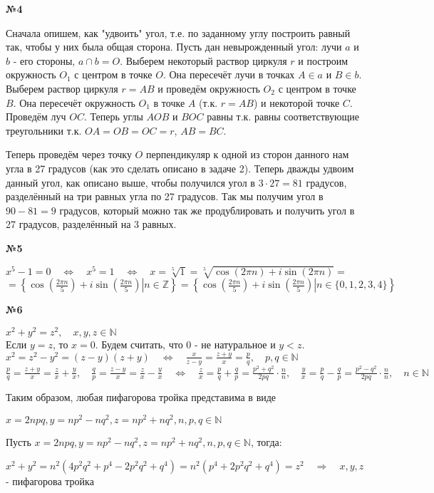 \documentclass{article}
\newenvironment{task}{\begin{center}\fontsize{14}{14}\selectfont\bf}{\rm\fontsize{12}{12}\selectfont\end{center}}
\newcommand{\impl}{\quad\Leftrightarrow\quad}
\newcommand{\rimpl}{\quad\Rightarrow\quad}
\newcommand{\Z}{\mathbb{Z}}
\newcommand{\N}{\mathbb{N}}
\begin{document}
	\begin{task} 
		№4
	\end{task}

	Сначала опишем, как "удвоить" угол, т.е. по заданному углу построить равный так, чтобы у них была общая сторона. 
	Пусть дан невырожденный угол: лучи $a$ и $b$ - его стороны, $a\cap b = O$. 
	Выберем некоторый раствор циркуля $r$ и построим окружность $O_1$ с центром в точке $O$. Она пересечёт лучи в точках $A\in a$ и $B\in b$. Выберем раствор циркуля $r=AB$ и проведём окружность $O_2$ с центром в точке $B$. Она пересечёт окружность $O_1$ в точке $A$ (т.к. $r=AB$) и некоторой точке $C$. Проведём луч $OC$. Теперь углы $AOB$ и $BOC$ равны т.к. равны соответствующие треугольники т.к. $OA=OB=OC=r$, $AB=BC$.
	
	Теперь проведём через точку $O$ перпендикуляр к одной из сторон данного нам угла в 27 градусов (как это сделать описано в задаче 2). Теперь дважды удвоим данный угол, как описано выше, чтобы получился угол в $3\cdot27=81$ градусов, разделённый на три равных угла по 27 градусов. Так мы получим угол в $90 - 81 = 9$ градусов, который можно так же продублировать и получить угол в 27 градусов, разделённый на 3 равных.   
	

	\begin{task} 
		№5
	\end{task}
	\begin{center}
		$x^5 - 1 = 0 \impl x^5 = 1 \impl x = \sqrt[5]{1} = \sqrt[5]{\cos(2\pi n) + i\sin(2 \pi n)} = $\\$
		= \left\lbrace  \cos\left(\frac{2\pi n}{5}\right) + i\sin\left(\frac{2 \pi n}{5}\right) \left|\right. n\in\Z \right\rbrace
		= \left\lbrace  \cos\left(\frac{2\pi n}{5}\right) + i\sin\left(\frac{2 \pi n}{5}\right) \left|\right. n\in \lbrace0, 1, 2, 3, 4\rbrace \right\rbrace$
	\end{center}


	\begin{task} 
		№6
	\end{task}
	\begin{center}
		$x^2 + y^2 = z^2, \quad x, y, z \in\N$ \\
		Если $y=z$, то $x=0$. Будем считать, что 0 - не натуральное и $y<z$.
		$x^2 = z^2 - y^2 = (z - y)(z + y) \impl \frac{x}{z-y}=\frac{z+y}{x} = \frac{p}{q}, \quad p, q\in\N$ \\
		$\frac{p}{q} = \frac{z + y}{x} = \frac{z}{x} + \frac{y}{x}, \quad \frac{q}{p} = \frac{z-y}{x} = \frac{z}{x} - \frac{y}{x} \impl \frac{z}{x} = \frac{p}{q} + \frac{q}{p} = \frac{p^2 + q^2}{2pq}\cdot\frac{n}{n}, \quad \frac{y}{x}=\frac{p}{q} - \frac{q}{p} = \frac{p^2 - q^2}{2pq}\cdot\frac{n}{n}, \quad n\in\N$
	\end{center}
	Таким образом, любая пифагорова тройка представима в виде 
		\begin{center}$x = 2npq, y = np^2 - nq^2, z = np^2 + nq^2, n,p, q\in\N$\\\end{center}
	Пусть $x = 2npq, y = np^2 - nq^2, z = np^2 + nq^2, n, p, q\in\N$, тогда:
	\begin{center}
		$x^2 + y^2 = n^2(4p^2q^2 + p^4 - 2p^2q^2 + q^4) = n^2(p^4 +2p^2q^2 +q^4) = z^2 \rimpl x, y, z$ - пифагорова тройка
	\end{center}
	
\end{document}
